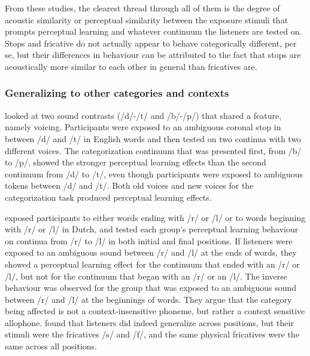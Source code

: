 From these studies, the clearest thread through all of them is the degree of acoustic similarity or perceptual similarity between the exposure stimuli that prompts perceptual learning and whatever continuum the listeners are tested on.  
Stops and fricative do not actually appear to behave categorically different, per se, but their differences in behaviour can be attributed to the fact that stops are acoustically more similar to each other in general than fricatives are.

\subsubsection{Generalizing to other categories and contexts}
\label{sec:othergeneralization}

\citet{Kraljic2006} looked at two sound contrasts (/d/-/t/ and /b/-/p/) that shared a feature, namely voicing.  
Participants were exposed to an ambiguous coronal stop in between /d/ and /t/ in English words and then tested on two continua with two different voices.  
The categorization continuum that was presented first, from /b/ to /p/, showed the stronger perceptual learning effects than the second continuum from /d/ to /t/, even though participants were exposed to ambiguous tokens between /d/ and /t/. 
 Both old voices and new voices for the categorization task produced perceptual learning effects.

\citet{Mitterer2013} exposed participants to either words ending with /r/ or /l/ or to words beginning with /r/ or /l/ in Dutch, and tested each group's perceptual learning behaviour on continua from /r/ to /l/ in both initial and final positions.  
If listeners were exposed to an ambiguous sound between /r/ and /l/ at the ends of words, they showed a perceptual learning effect for the continuum that ended with an /r/ or /l/, but not for the continuum that began with an /r/ or an /l/.  
The inverse behaviour was observed for the group that was exposed to an ambiguous sound between /r/ and /l/ at the beginnings of words.  
They argue that the category being affected is not a context-insensitive phoneme, but rather a context sensitive allophone.  
\citet{Jesse2011} found that listeners did indeed generalize across positions, but their stimuli were the fricatives /s/ and /f/, and the same physical fricatives were the same across all positions.


